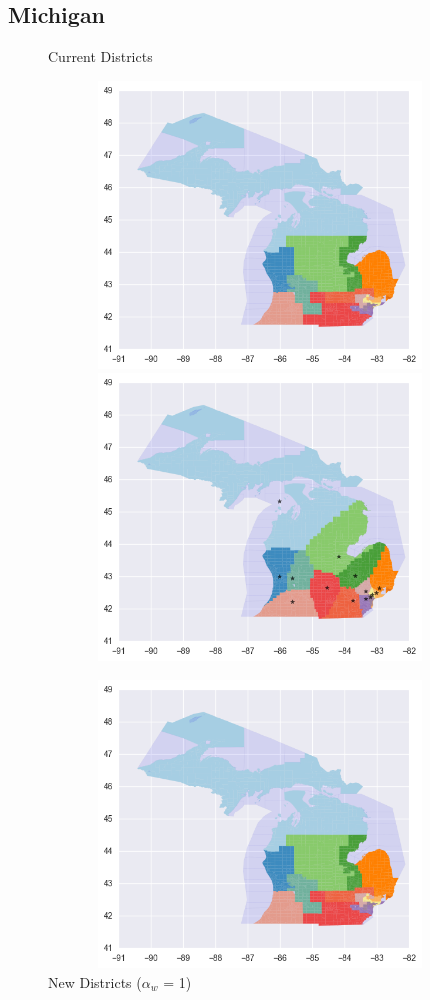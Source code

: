 \clearpage
\newpage

\subsection{Michigan}
\begin{figure}[htb!] \centering
\caption{ Current Districts }
\includegraphics[width=5in,height=3in,keepaspectratio]{../maps/MI/static/before.png}
\includegraphics[width=5in,height=3in,keepaspectratio]{../maps/MI/static/0_0_after.png}
\caption{ New Districts ($\alpha_w$ = 1) }
\includegraphics[width=5in,height=3in,keepaspectratio]{../maps/MI/static/before.png}

\end{figure}
